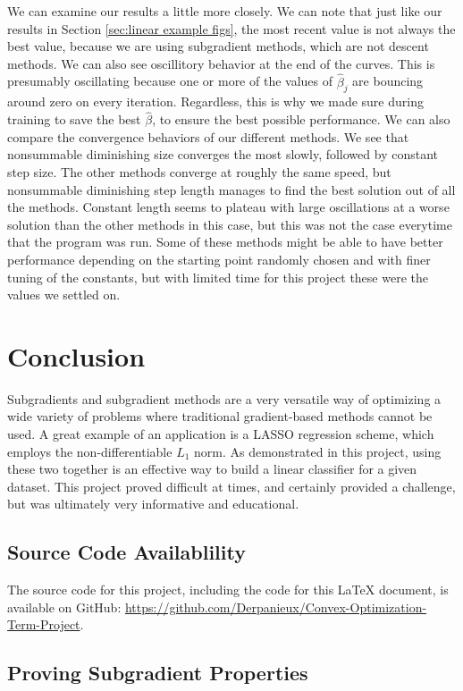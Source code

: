 \documentclass[journal,onecolumn]{IEEEtran}
\begin{document}
We can examine our results a little more closely. We can note that just like our results in Section \ref{sec:linear example figs}, the most recent value is not always the best value, because we are using subgradient methods, which are not descent methods. We can also see oscillitory behavior at the end of the curves. This is presumably oscillating because one or more of the values of \(\hat{\beta}_j\) are bouncing around zero on every iteration. Regardless, this is why we made sure during training to save the best \(\hat{\beta}\), to ensure the best possible performance. We can also compare the convergence behaviors of our different methods. We see that nonsummable diminishing size converges the most slowly, followed by constant step size. The other methods converge at roughly the same speed, but nonsummable diminishing step length manages to find the best solution out of all the methods. Constant length seems to plateau with large oscillations at a worse solution than the other methods in this case, but this was not the case everytime that the program was run. Some of these methods might be able to have better performance depending on the starting point randomly chosen and with finer tuning of the constants, but with limited time for this project these were the values we settled on.

\section{Conclusion}\label{sec:conclusion}
Subgradients and subgradient methods are a very versatile way of optimizing a wide variety of problems where traditional gradient-based methods cannot be used. A great example of an application is a LASSO regression scheme, which employs the non-differentiable \(L_1\) norm. As demonstrated in this project, using these two together is an effective way to build a linear classifier for a given dataset. This project proved difficult at times, and certainly provided a challenge, but was ultimately very informative and educational.

\appendix
\subsection{Source Code Availablility}\label{sec:github}
The source code for this project, including the code for this \LaTeX{ }document, is available on GitHub: \url{https://github.com/Derpanieux/Convex-Optimization-Term-Project}. 

\subsection{Proving Subgradient Properties}\label{sec:subgradient properties proofs}
\end{document}
